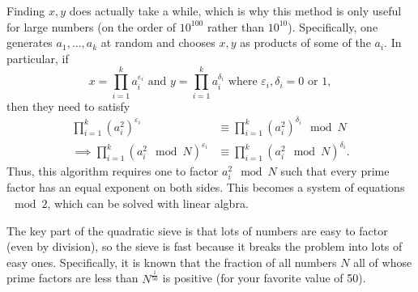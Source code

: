 Finding $x,y$ does actually take a while, which is why this method is only useful for large numbers (on the order of $10^{100}$ rather than $10^{10}$). Specifically, one generates $a_1,\dots,a_k$ at random and chooses $x,y$ as products of some of the $a_i$. In particular, if
\[x = \prod_{i=1}^k a_i^{\varepsilon_i} \text{ and } y = \prod_{i=1}^k a_i^{\delta_i} \text{ where } \varepsilon_i,\delta_i = 0 \text{ or } 1,\]
then they need to satisfy
\begin{align*}
\prod_{i=1}^k \left(a_i^2\right)^{\varepsilon_i} &\equiv \prod_{i=1}^k \left(a_i^2\right)^{\delta_i} \mod N\\
\implies \prod_{i=1}^k \left(a_i^2\mod N\right)^{\varepsilon_i} &\equiv \prod_{i=1}^k \left(a_i^2\mod N\right)^{\delta_i}.
\end{align*}
Thus, this algorithm requires one to factor $a_i^2\mod N$ such that every prime factor has an equal exponent on both sides. This becomes a system of equations $\mod 2$, which can be solved with linear algbra.

The key part of the quadratic sieve is that lots of numbers are easy to factor (even by division), so the sieve is fast because it breaks the problem into lots of easy ones. Specifically, it is known that the fraction of all numbers $N$ all of whose prime factors are less than $N^{\frac{1}{50}}$ is positive (for your favorite value of 50).
%
